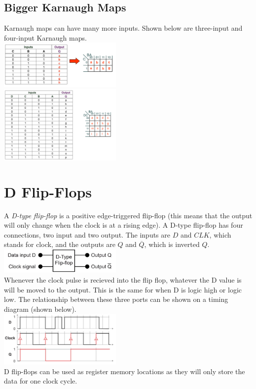 \documentclass[a4paper,11pt, twocolumn]{article}
\begin{document}
\subsection{Bigger Karnaugh Maps}
Karnaugh maps can have many more inputs. Shown below are three-input and four-input Karnaugh maps.\\
\includegraphics[width=0.45\textwidth]{kMaps CBA inp.PNG}\\
\includegraphics[width=0.45\textwidth]{kMaps DCBA inp.PNG}\\

\section{D Flip-Flops}
A \textit{D-type flip-flop} is a positive edge-triggered flip-flop (this means that the output will only change when the clock is at a rising edge). A D-type flip-flop has four connections, two input and two output. The inputs are $D$ and $CLK$, which stands for clock, and the outputs are $Q$ and $\overline{Q}$, which is inverted $Q$.\\
\includegraphics[width=0.45\textwidth]{d-flop.jpg}\\
Whenever the clock pulse is recieved into the flip flop, whatever the D value is will be moved to the output. This is the same for when D is logic high or logic low. The relationship between these three ports can be shown on a timing diagram (shown below).\\
\includegraphics[width=0.45\textwidth]{d-flopTiming.jpg}\\
D flip-flops can be used as register memory locations as they will only store the data for one clock cycle. 
\end{document}
